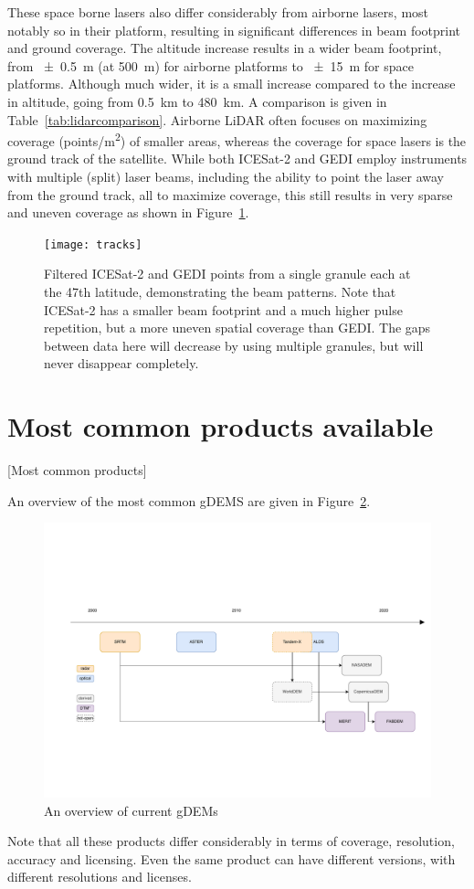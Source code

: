 These space borne lasers also differ considerably from airborne lasers, most notably so in their platform, resulting in significant differences in beam footprint and ground coverage.
The altitude increase results in a wider beam footprint, from \qty{\pm0.5}{m} (at \qty{500}{m}) for airborne platforms to \qty{\pm15}{m} for space platforms.
Although much wider, it is a small increase compared to the increase in altitude, going from \qty{0.5}{km} to \qty{480}{km}.
A comparison is given in Table~\ref{tab:lidarcomparison}.
Airborne LiDAR often focuses on maximizing coverage (\unit{points/m^2}) of smaller areas, whereas the coverage for space lasers is the ground track of the satellite.
While both ICESat-2 and GEDI employ instruments with multiple (split) laser beams, including the ability to point the laser away from the ground track, all to maximize coverage, this still results in very sparse and uneven coverage as shown in Figure~\ref{fig:beams}.
\begin{figure}
  \centering
  \texttt{[image: tracks]}
  \caption{Filtered ICESat-2 and GEDI points from a single granule each at the 47th latitude, demonstrating the beam patterns.
    Note that ICESat-2 has a smaller beam footprint and a much higher pulse repetition, but a more uneven spatial coverage than GEDI\@.
    The gaps between data here will decrease by using multiple granules, but will never disappear completely.}%
  \label{fig:beams}
\end{figure}


%
\section{Most common products available}[Most common products]

An overview of the most common gDEMS are given in Figure~\ref{fig:gdem_inheritance}.
\begin{figure}
  \centering
  \includegraphics[width=\linewidth]{dems_overview}
  \caption{An overview of current gDEMs}%
  \label{fig:gdem_inheritance}
\end{figure}
Note that all these products differ considerably in terms of coverage, resolution, accuracy and licensing.
Even the same product can have different versions, with different resolutions and licenses.

